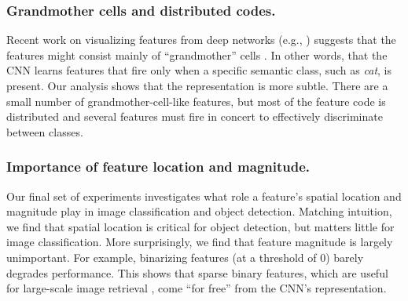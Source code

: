 \subsubsection{Grandmother cells and distributed codes.}
Recent work on visualizing features from deep networks (e.g., \cite{GoogleCat,DeConv}) suggests that the features might consist mainly of ``grandmother'' cells \cite{Barlow,Grandmother}.
In other words, that the CNN learns features that fire only when a specific semantic class, such as \emph{cat}, is present.
Our analysis shows that the representation is more subtle.
There are a small number of grandmother-cell-like features, but most of the feature code is distributed and several features must fire in concert to effectively discriminate between classes.

\subsubsection{Importance of feature location and magnitude.}
Our final set of experiments investigates what role a feature's spatial location and magnitude play in image classification and object detection.
Matching intuition, we find that spatial location is critical for object detection, but matters little for image classification.
More surprisingly, we find that feature magnitude is largely unimportant.
For example, binarizing features (at a threshold of 0) barely degrades performance.
This shows that sparse binary features, which are useful for large-scale image retrieval \cite{weiss2009spectral,gong2011iterative}, come ``for free'' from the CNN's representation.


